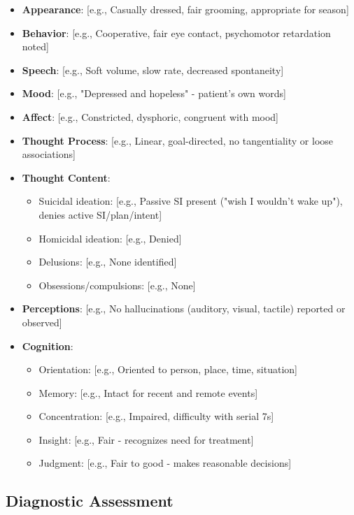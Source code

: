 \documentclass[11pt,letterpaper]{article}
\begin{document}
\begin{itemize}[leftmargin=*]
    \item \textbf{Appearance}: [e.g., Casually dressed, fair grooming, appropriate for season]
    \item \textbf{Behavior}: [e.g., Cooperative, fair eye contact, psychomotor retardation noted]
    \item \textbf{Speech}: [e.g., Soft volume, slow rate, decreased spontaneity]
    \item \textbf{Mood}: [e.g., "Depressed and hopeless" - patient's own words]
    \item \textbf{Affect}: [e.g., Constricted, dysphoric, congruent with mood]
    \item \textbf{Thought Process}: [e.g., Linear, goal-directed, no tangentiality or loose associations]
    \item \textbf{Thought Content}:
    \begin{itemize}
        \item Suicidal ideation: [e.g., Passive SI present ("wish I wouldn't wake up"), denies active SI/plan/intent]
        \item Homicidal ideation: [e.g., Denied]
        \item Delusions: [e.g., None identified]
        \item Obsessions/compulsions: [e.g., None]
    \end{itemize}
    \item \textbf{Perceptions}: [e.g., No hallucinations (auditory, visual, tactile) reported or observed]
    \item \textbf{Cognition}:
    \begin{itemize}
        \item Orientation: [e.g., Oriented to person, place, time, situation]
        \item Memory: [e.g., Intact for recent and remote events]
        \item Concentration: [e.g., Impaired, difficulty with serial 7s]
        \item Insight: [e.g., Fair - recognizes need for treatment]
        \item Judgment: [e.g., Fair to good - makes reasonable decisions]
    \end{itemize}
\end{itemize}

\subsection*{Diagnostic Assessment}
\end{document}
